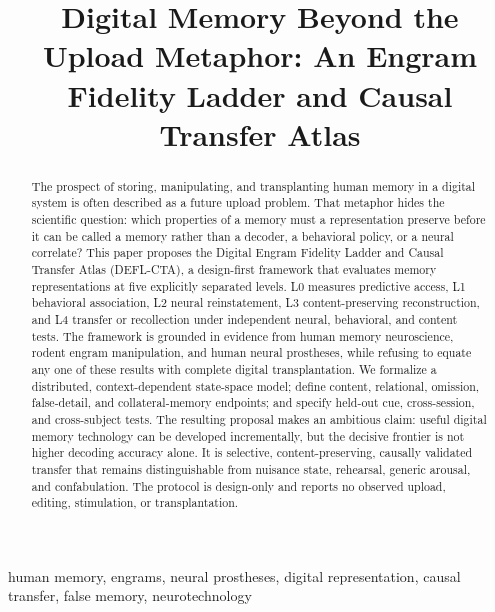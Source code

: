 \documentclass[conference]{IEEEtran}
\begin{document}
\title{Digital Memory Beyond the Upload Metaphor: An Engram Fidelity Ladder and Causal Transfer Atlas}

\author{
}

\maketitle

\begin{abstract}
The prospect of storing, manipulating, and transplanting human memory in a digital system is often described as a future upload problem. That metaphor hides the scientific question: which properties of a memory must a representation preserve before it can be called a memory rather than a decoder, a behavioral policy, or a neural correlate? This paper proposes the Digital Engram Fidelity Ladder and Causal Transfer Atlas (DEFL-CTA), a design-first framework that evaluates memory representations at five explicitly separated levels. L0 measures predictive access, L1 behavioral association, L2 neural reinstatement, L3 content-preserving reconstruction, and L4 transfer or recollection under independent neural, behavioral, and content tests. The framework is grounded in evidence from human memory neuroscience, rodent engram manipulation, and human neural prostheses, while refusing to equate any one of these results with complete digital transplantation. We formalize a distributed, context-dependent state-space model; define content, relational, omission, false-detail, and collateral-memory endpoints; and specify held-out cue, cross-session, and cross-subject tests. The resulting proposal makes an ambitious claim: useful digital memory technology can be developed incrementally, but the decisive frontier is not higher decoding accuracy alone. It is selective, content-preserving, causally validated transfer that remains distinguishable from nuisance state, rehearsal, generic arousal, and confabulation. The protocol is design-only and reports no observed upload, editing, stimulation, or transplantation.
\end{abstract}

\begin{IEEEkeywords}
human memory, engrams, neural prostheses, digital representation, causal transfer, false memory, neurotechnology
\end{IEEEkeywords}
\end{document}
